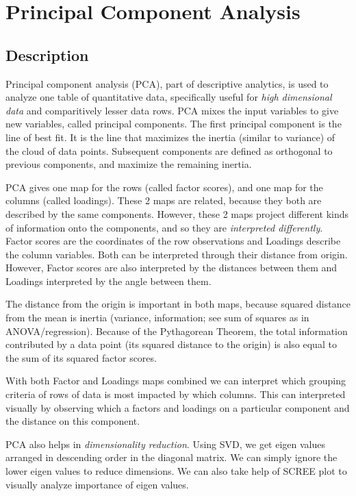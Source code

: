\documentclass[]{book}
\begin{document}
\hypertarget{PCA}{%
\chapter{Principal Component Analysis}\label{PCA}}

\hypertarget{description}{%
\section{Description}\label{description}}

Principal component analysis (PCA), part of descriptive analytics, is
used to analyze one table of quantitative data, specifically useful for
\emph{high dimensional data} and comparitively lesser data rows. PCA
mixes the input variables to give new variables, called principal
components. The first principal component is the line of best fit. It is
the line that maximizes the inertia (similar to variance) of the cloud
of data points. Subsequent components are defined as orthogonal to
previous components, and maximize the remaining inertia.

PCA gives one map for the rows (called factor scores), and one map for
the columns (called loadings). These 2 maps are related, because they
both are described by the same components. However, these 2 maps project
different kinds of information onto the components, and so they are
\emph{interpreted differently}. Factor scores are the coordinates of the
row observations and Loadings describe the column variables. Both can be
interpreted through their distance from origin. However, Factor scores
are also interpreted by the distances between them and Loadings
interpreted by the angle between them.

The distance from the origin is important in both maps, because squared
distance from the mean is inertia (variance, information; see sum of
squares as in ANOVA/regression). Because of the Pythagorean Theorem, the
total information contributed by a data point (its squared distance to
the origin) is also equal to the sum of its squared factor scores.

With both Factor and Loadings maps combined we can interpret which
grouping criteria of rows of data is most impacted by which columns.
This can interpreted visually by observing which a factors and loadings
on a particular component and the distance on this component.

PCA also helps in \emph{dimensionality reduction}. Using SVD, we get
eigen values arranged in descending order in the diagonal matrix. We can
simply ignore the lower eigen values to reduce dimensions. We can also
take help of SCREE plot to visually analyze importance of eigen values.
\end{document}
